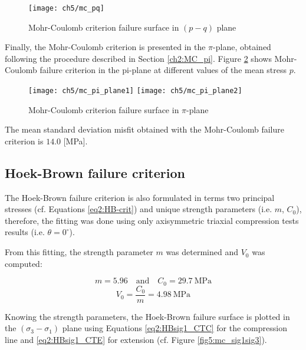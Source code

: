 \begin{figure}[p]
    \centering
    \texttt{[image: ch5/mc\_pq]}
    \caption{Mohr-Coulomb criterion failure surface in  $(p-q)$ plane}
    \label{fig5:mc_pq}
\end{figure} 

Finally, the Mohr-Coulomb criterion is presented in the $\pi$-plane, obtained following the procedure described in Section \ref{ch2:MC_pi}. Figure \ref{fig5:mc_pi_plane} shows Mohr-Coulomb failure criterion in the pi-plane at different values of the mean stress $p$.

\begin{figure}[tb]
    \centering
    \texttt{[image: ch5/mc\_pi\_plane1]}
    \texttt{[image: ch5/mc\_pi\_plane2]}
    \caption{Mohr-Coulomb criterion failure surface in  $\pi$-plane}
    \label{fig5:mc_pi_plane}
\end{figure} 

The mean standard deviation misfit obtained with the Mohr-Coulomb failure criterion is $14.0$ [\si{\mega\pascal}]. 

\subsection{Hoek-Brown failure criterion}

The Hoek-Brown failure criterion is also formulated in terms two principal stresses (cf. Equations \ref{eq2:HB-crit}) and unique strength parameters (i.e. $m$, $C_0$), therefore, the fitting was done using only axisymmetric triaxial compression tests results (i.e. $\theta = 0^\circ$). 

From this fitting, the strength parameter $m$ was determined and $V_0$ was computed: 

\begin{equation}
    m = 5.96 \quad \textrm{and} \quad C_0 = \SI{29.7}{\mega\pascal}
\end{equation}
\begin{equation}
    V_0 = \frac{C_0}{m} = \SI{4.98}{\mega\pascal}
\end{equation}

Knowing the strength parameters, the Hoek-Brown failure surface is plotted in the $(\sigma_3-\sigma_1)$ plane using Equations \ref{eq2:HBsig1_CTC} for the compression line and \ref{eq2:HBsig1_CTE} for extension (cf. Figure \ref{fig5:mc_sig1sig3}).

